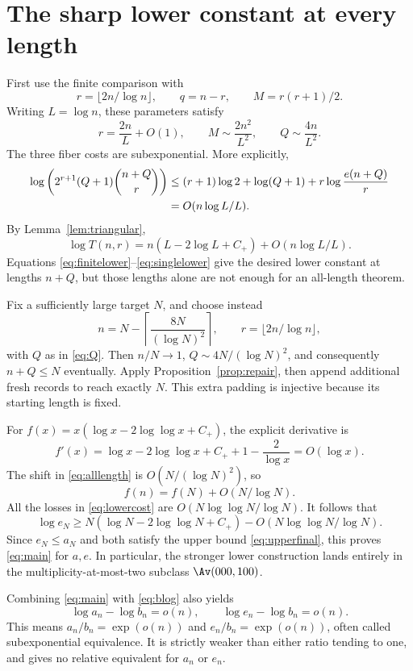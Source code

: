 \section{The sharp lower constant at every length}\label{sec:lower}
First use the finite comparison with
\[
 r=\lfloor2n/\log n\rfloor,\qquad q=n-r,\qquad M=r(r+1)/2.
\]
Writing $L=\log n$, these parameters satisfy
\begin{equation}\label{eq:optimparameters}
 r=\frac{2n}{L}+O(1),\qquad M\sim\frac{2n^2}{L^2},\qquad
 Q\sim\frac{4n}{L^2}.
\end{equation}
The three fiber costs are subexponential. More explicitly,
\begin{align}
 \log\left(2^{r+1}(Q+1)\binom{n+Q}{r}\right)
 &\le(r+1)\log2+\log(Q+1)
      +r\log\frac{e(n+Q)}r\notag\\
 &=O(n\log L/L).\label{eq:lowercost}
\end{align}
By Lemma~\ref{lem:triangular},
\begin{equation}\label{eq:singlelower}
 \log T(n,r)=n(L-2\log L+C_+)+O(n\log L/L).
\end{equation}
Equations \eqref{eq:finitelower}--\eqref{eq:singlelower} give the desired lower constant at lengths $n+Q$, but those lengths alone are not enough for an all-length theorem.

Fix a sufficiently large target $N$, and choose instead
\begin{equation}\label{eq:alllength}
 n=N-\left\lceil\frac{8N}{(\log N)^2}\right\rceil,
 \qquad r=\lfloor2n/\log n\rfloor,
\end{equation}
with $Q$ as in \eqref{eq:Q}. Then $n/N\to1$, $Q\sim4N/(\log N)^2$, and consequently $n+Q\le N$ eventually. Apply Proposition~\ref{prop:repair}, then append additional fresh records to reach exactly $N$. This extra padding is injective because its starting length is fixed.

For $f(x)=x(\log x-2\log\log x+C_+)$, the explicit derivative is
\[
 f'(x)=\log x-2\log\log x+C_++1-\frac2{\log x}=O(\log x).
\]
The shift in \eqref{eq:alllength} is $O(N/(\log N)^2)$, so
\[
 f(n)=f(N)+O(N/\log N).
\]
All the losses in \eqref{eq:lowercost} are $O(N\log\log N/\log N)$. It follows that
\begin{equation}\label{eq:lowerfinal}
 \log e_N\ge N(\log N-2\log\log N+C_+)
                  -O(N\log\log N/\log N).
\end{equation}
Since $e_N\le a_N$ and both satisfy the upper bound \eqref{eq:upperfinal}, this proves \eqref{eq:main} for $a,e$. In particular, the stronger lower construction lands entirely in the multiplicity-at-most-two subclass $\Av(000,100)$.

Combining \eqref{eq:main} with \eqref{eq:blog} also yields
\[
 \log a_n-\log b_n=o(n),\qquad \log e_n-\log b_n=o(n).
\]
This means $a_n/b_n=\exp(o(n))$ and $e_n/b_n=\exp(o(n))$, often called subexponential equivalence. It is strictly weaker than either ratio tending to one, and gives no relative equivalent for $a_n$ or $e_n$.
